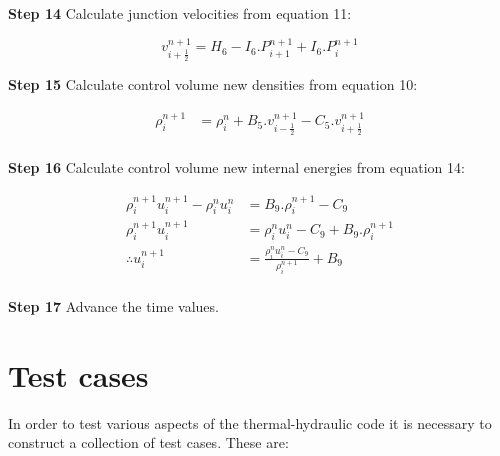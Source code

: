 \documentclass[11pt,letterpaper,titlepage]{article}
\newcommand{\half}{\frac{1}{2}}
\begin{document}
\newpage
\noindent
\textbf{Step 14}\newline
Calculate junction velocities from equation 11:

\begin{equation*}
v_{i+\half}^{n+1}=H_6-I_6.P_{i+1}^{n+1}+I_6.P_{i}^{n+1}
\end{equation*}







\vspace{0.5cm}\noindent
\textbf{Step 15}\newline
Calculate control volume new densities from equation 10:

\begin{equation*}
\begin{aligned}
\rho_i^{n+1}&=\rho_i^{n}+B_5.v_{i-\half}^{n+1} - C_5.v_{i+\half}^{n+1}\\
\end{aligned}
\end{equation*}





\vspace{0.5cm}\noindent
\textbf{Step 16}\newline
Calculate control volume new internal energies from equation 14:

\begin{equation*}
\begin{aligned}
\rho_{i}^{n+1}u_{i}^{n+1} - \rho_{i}^{n}u_{i}^{n} &= B_9.\rho_{i}^{n+1}-C_9 \\
\rho_{i}^{n+1}u_{i}^{n+1} &= \rho_{i}^{n}u_{i}^{n}-C_9 + B_9.\rho_{i}^{n+1} \\
\therefore u_{i}^{n+1} &= \frac{\rho_{i}^{n}u_{i}^{n}-C_9}{\rho_{i}^{n+1}} + B_9 \\
\end{aligned}
\end{equation*}




\vspace{0.5cm}\noindent
\textbf{Step 17}\newline
Advance the time values.










\newpage
{}
\section{Test cases}
In order to test various aspects of the thermal-hydraulic code it is necessary to construct a collection of test cases. These are:
\end{document}
